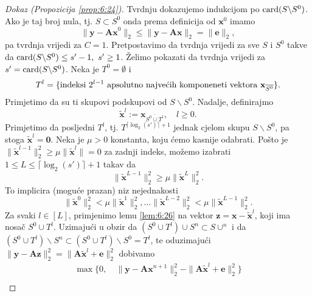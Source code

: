 \documentclass[a4paper,twoside,12pt]{memoir} %
\newcommand{\vect}[1]{\mathbf{#1}}
\renewcommand{\vec}{\vect}
\newcommand{\card}{\text{\normalfont{card}}}
\newcommand{\norm}[1]{\|{#1}\|}
\begin{document}
\begin{proof}[Dokaz (Propozicija \ref{prop:6:24})]
    Tvrdnju dokazujemo indukcijom po $\card(S \backslash S^0)$. Ako je taj broj nula, tj. $S \subset S^0$ onda prema definicija od $\vec x^0$ imamo
    \begin{equation*}
        \norm{\vec y - \vec{Ax}^0}_2 \leq \norm{\vec y - \vec{Ax}}_2 = \norm{\vec e}_2, 
    \end{equation*}
    pa tvrdnja vrijedi za $C=1$. Pretpostavimo da tvrdnja vrijedi za sve $S$ i $S^0$ takve da $\card(S \backslash S^0) \leq s'-1,\ s' \geq 1$. \v{Z}elimo pokazati da tvrdnja vrijedi za $s' = \card(S \backslash S^0)$. Neka je $T^0 = \emptyset$ i 
    \begin{equation*}
        T^l = \{\text{indeksi $ 2^{l-1}$ apsolutno najve\'cih komponeneti vektora }\vec x_{\overline{S^0}}\}. 
    \end{equation*}
    Primjetimo da su ti skupovi podskupovi od $S \backslash S^0$. Nadalje, definirajmo
    \begin{equation*}
        \tilde{\vec x}^l := \vec x_{\overline{S^0 \cup T^l}}, \quad l \geq 0.
    \end{equation*}
    Primjetimo da posljedni $T^l$, tj. $T^{\lceil \log_2(s')\rceil + 1}$ jednak cjelom skupu $S \backslash S^0$, pa stoga $\tilde{\vec x}^l = \vec 0$. Neka je $\mu > 0$ konstanta, koju \'cemo kasnije odabrati. Po\v{s}to je $\norm{\tilde{\vec x}^{l-1}}_2^2 \geq \mu \norm{\tilde{\vec x}^l} = 0$ za zadnji indeks, mo\v{z}emo izabrati $1 \leq L \leq \lceil \log_2(s')\rceil + 1$ takav da
    \begin{equation*}
        \norm{\tilde{\vec x}^{L-1}}_2^2 \geq \mu \norm{\tilde{\vec x}^L}_2^2. 
    \end{equation*}
    To implicira (mogu\'ce prazan) niz nejednakosti
    \begin{equation*}
        \norm{\tilde{\vec x}^0}_2^2 < \mu \norm{\tilde{\vec x}^1}_2^2, \dots \norm{\tilde{\vec x}^{L-2}}_2^2 < \mu \norm{\tilde{\vec x}^{L-1}}_2^2.
    \end{equation*}
    Za svaki $l \in [L]$, primjenimo lemu \ref{lem:6:26} na vektor $\vec z = \vec x - \tilde{\vec x}^l$, koji ima nosa\v{c} $S^0 \cup T^l$. Uzimaju\'ci u obzir da $(S^0 \cup T^l) \cup S^n \subset S \cup ^n$ i da $(S^0 \cup T^l) \backslash S^n \subset (S^0 \cup T^l) \backslash S^0 = T^l$, te oduzimaju\'ci $\norm{\vec y - \vec{Az}}_2^2 = \norm{\vec A \tilde{\vec x}^l + \vec e}_2^2$ dobivamo
    \begin{align*}
        \max \{0,&\ \norm{\vec y - \vec{Ax}^{n+1}}_2^2 - \norm{\vec{A}\tilde{\vec x}^l + \vec e}_2^2 \}\\[0.5em]

\end{align*}
\end{proof}
\end{document}

